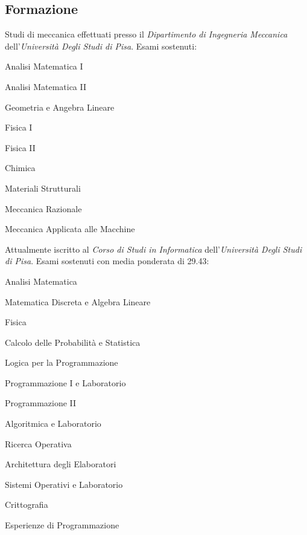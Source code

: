 \documentclass[10pt]{article} %
\begin{document}
\begin{paracol}{2}
\section{Formazione}

Studi di meccanica effettuati presso il \textit{Dipartimento di Ingegneria Meccanica} dell'\textit{Universit\`{a} Degli Studi di Pisa}. Esami sostenuti:
\begin{compactitem}
    \item Analisi Matematica I
    \item Analisi Matematica II
    \item Geometria e Angebra Lineare
    \item Fisica I
    \item Fisica II
    \item Chimica
    \item Materiali Strutturali
    \item Meccanica Razionale
    \item Meccanica Applicata alle Macchine
\end{compactitem}

\medskip
Attualmente iscritto al \textit{Corso di Studi in Informatica} dell'\textit{Universit\`{a} Degli Studi di Pisa}. Esami sostenuti con media ponderata di 29.43:
\begin{compactitem}
    \item Analisi Matematica
    \item Matematica Discreta e Algebra Lineare
    \item Fisica
    \item Calcolo delle Probabilit\`{a} e Statistica
    \item Logica per la Programmazione
    \item Programmazione I e Laboratorio
    \item Programmazione II
    \item Algoritmica e Laboratorio
    \item Ricerca Operativa
    \item Architettura degli Elaboratori
    \item Sistemi Operativi e Laboratorio
    \item Crittografia
    \item Esperienze di Programmazione
\end{compactitem}



\end{paracol}
\end{document}
